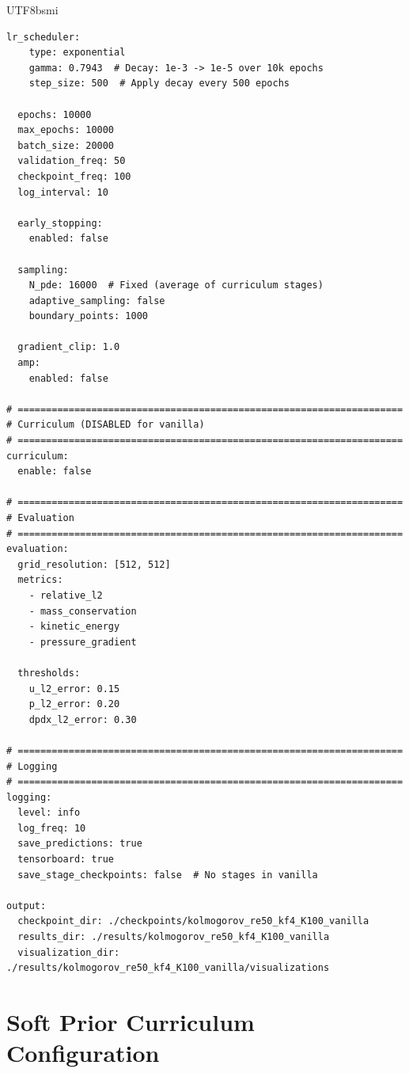 \documentclass[master]{NTHUthesis}
\begin{document}
\begin{CJK*}{UTF8}{bsmi}
\begin{small}
\begin{lstlisting}[style=yamlStyle]
  lr_scheduler:
    type: exponential
    gamma: 0.7943  # Decay: 1e-3 -> 1e-5 over 10k epochs
    step_size: 500  # Apply decay every 500 epochs
  
  epochs: 10000
  max_epochs: 10000
  batch_size: 20000
  validation_freq: 50
  checkpoint_freq: 100
  log_interval: 10
  
  early_stopping:
    enabled: false
  
  sampling:
    N_pde: 16000  # Fixed (average of curriculum stages)
    adaptive_sampling: false
    boundary_points: 1000
  
  gradient_clip: 1.0
  amp:
    enabled: false

# ====================================================================
# Curriculum (DISABLED for vanilla)
# ====================================================================
curriculum:
  enable: false

# ====================================================================
# Evaluation
# ====================================================================
evaluation:
  grid_resolution: [512, 512]
  metrics:
    - relative_l2
    - mass_conservation
    - kinetic_energy
    - pressure_gradient
  
  thresholds:
    u_l2_error: 0.15
    p_l2_error: 0.20
    dpdx_l2_error: 0.30

# ====================================================================
# Logging
# ====================================================================
logging:
  level: info
  log_freq: 10
  save_predictions: true
  tensorboard: true
  save_stage_checkpoints: false  # No stages in vanilla

output:
  checkpoint_dir: ./checkpoints/kolmogorov_re50_kf4_K100_vanilla
  results_dir: ./results/kolmogorov_re50_kf4_K100_vanilla
  visualization_dir: ./results/kolmogorov_re50_kf4_K100_vanilla/visualizations
\end{lstlisting}
\end{small}

\clearpage

\section{Soft Prior Curriculum Configuration}
\label{appendix:config_rans_prior}


\end{CJK*}
\end{document}
